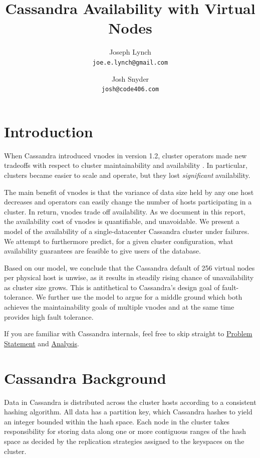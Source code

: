 \documentclass{article}
\title{Cassandra Availability with Virtual Nodes}
\author{
  Joseph Lynch\\
  \texttt{joe.e.lynch@gmail.com}
  \and
  Josh Snyder\\
  \texttt{josh@code406.com}
}
\begin{document}
\maketitle

\section{Introduction}
When Cassandra introduced vnodes in version 1.2, cluster operators made new tradeoffs
with respect to cluster maintainability and availability \cite{vnodes}. In particular,
clusters became easier to scale and operate, but they lost \textit{significant}
availability.

The main benefit of vnodes is that the variance of data size held by any one host
decreases and operators can easily change the number of hosts participating in a
cluster. In return, vnodes trade off availability. As we document in this report,
the availability cost of vnodes is quantifiable, and unavoidable. We present a model
of the availability of a single-datacenter Cassandra cluster under failures. We
attempt to furthermore predict, for a given cluster configuration, what availability
guarantees are feasible to give users of the database.

Based on our model, we conclude that the Cassandra default of 256 virtual nodes
per physical host is unwise, as it results in steadily rising chance of
unavailability as cluster size grows. This is antithetical to Cassandra's
design goal of fault-tolerance. We further use the model to argue for a middle
ground which both achieves the maintainability goals of multiple vnodes and
at the same time provides high fault tolerance.

If you are familiar with Cassandra internals, feel free to skip straight to
\hyperref[sec:problem]{Problem Statement} and \hyperref[sec:analysis]{Analysis}.

\section{Cassandra Background}
Data in Cassandra is distributed across the cluster hosts according to a
consistent hashing algorithm. All data has a partition key, which Cassandra
hashes to yield an integer bounded within the hash space. Each node in the
cluster takes responsibility for storing data along one or more contiguous
ranges of the hash space as decided by the replication strategies assigned
to the keyspaces on the cluster.
\end{document}
